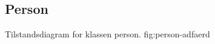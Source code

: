 \subsection{Person}
\label{sec:person}


            {Tilstandsdiagram for klassen person.}
            {fig:person-adfaerd}
